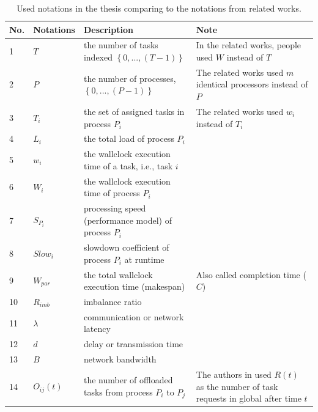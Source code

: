 \begin{table}[t]
\centering
\begin{tabular}{|l|p{2cm}|p{5cm}|p{4.5cm}|}
\hline
\textbf{No.} & \textbf{Notations} & \textbf{Description} & \textbf{Note}        \\ \hline
1  & $T$          & the number of tasks indexed $\left \{0,...,(T-1) \right \}$ & In the related works, people used $W$ instead of $T$   \\ \hline
2  & $P$					& the number of processes, $\left \{0,...,(P-1) \right \}$    & The related works used $m$ identical processors instead of $P$ \\ \hline
3  & $T_{i}$			& the set of assigned tasks in process $P_{i}$                & The related works used $w_{i}$ instead of $T_{i}$              \\ \hline
4  & $L_{i}$			& the total load of process $P_{i}$                           &                                             \\ \hline
5  & $w_{i}$			& the wallclock execution time of a task, i.e., task $i$      &                                             \\ \hline
6  & $W_{i}$ 			& the wallclock execution time of process $P_{i}$             &                                             \\ \hline
7  & $S_{P_{i}}$	& processing speed (performance model) of process $P_{i}$     &                                             \\ \hline
8  & $Slow_{i}$		& slowdown coefficient of process $P_{i}$ at runtime          &                                             \\ \hline
9  & $W_{par}$		& the total wallclock execution time (makespan)               & Also called completion time ($C$)           \\ \hline
10 & $R_{imb}$		& imbalance ratio                                             &                                             \\ \hline
11 & $\lambda$		& communication or network latency                            &                                             \\ \hline
12 & $d$					& delay or transmission time                                  &                                             \\ \hline
13 & $B$					& network bandwidth                                           &                                             \\ \hline
14 & $O_{ij}(t)$	& the number of offloaded tasks from process $P_{i}$ to $P_{j}$  & The authors in \cite{tchiboukdjian2010tighter} used $R(t)$ as the number of task requests in global after time $t$ \\ \hline
\end{tabular}
\caption{Used notations in the thesis comparing to the notations from related works.}
\label{tab:mapped_notation_table}
\end{table}


